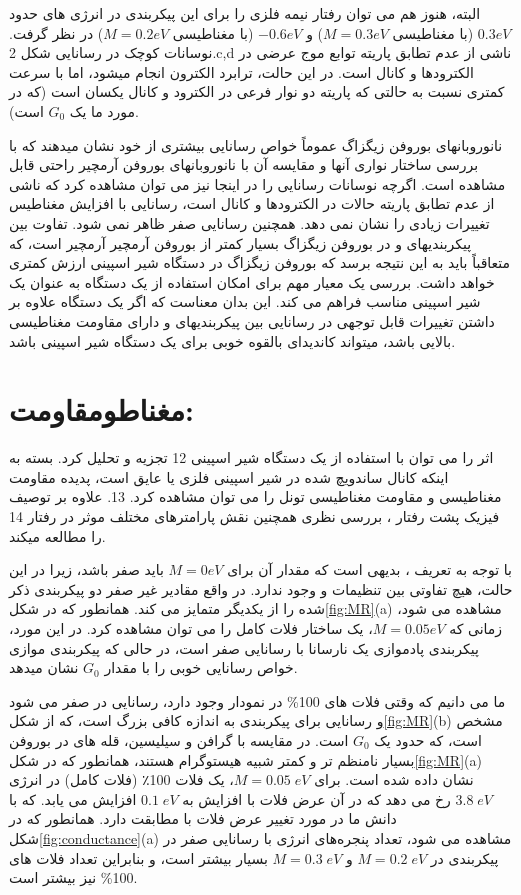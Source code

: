 البته، هنوز هم می توان رفتار نیمه فلزی را برای این پیکربندی در انرژی های حدود $0.3 eV$ (با مغناطیسی $M = 0.3 eV$) و $-0.6 eV$ (با مغناطیسی $M = 0.2 eV$) در نظر گرفت. نوسانات کوچک در رسانایی شکل 2.c,d ناشی از عدم تطابق پاریته توابع موج عرضی در الکترودها و کانال است. در این حالت، ترابرد الکترون انجام میشود، اما با سرعت کمتری نسبت به حالتی که پاریته دو نوار فرعی در الکترود و کانال یکسان است (که در مورد ما یک $G_0$ است).

نانوروبانهای بوروفن زیگزاگ عموماً خواص رسانایی بیشتری از خود نشان میدهند که با بررسی ساختار نواری آنها و مقایسه آن با نانوروبانهای بوروفن آرمچیر راحتی قابل مشاهده است. اگرچه نوسانات رسانایی را در اینجا نیز می توان مشاهده کرد که ناشی از عدم تطابق پاریته حالات در الکترودها و کانال است، رسانایی با افزایش مغناطیس تغییرات زیادی را نشان نمی دهد. همچنین رسانایی صفر ظاهر نمی شود. تفاوت بین پیکربندیهای  و  در بوروفن زیگزاگ بسیار کمتر از بوروفن آرمچیر آرمچیر است، که متعاقباً باید به این نتیجه برسد که بوروفن زیگزاگ در دستگاه شیر اسپینی ارزش کمتری خواهد داشت. بررسی  یک معیار مهم برای امکان استفاده از یک دستگاه به عنوان یک شیر اسپینی مناسب فراهم می کند. این بدان معناست که اگر یک دستگاه علاوه بر داشتن تغییرات قابل توجهی در رسانایی بین پیکربندیهای  و  دارای مقاومت مغناطیسی بالایی باشد، میتواند کاندیدای بالقوه خوبی برای یک دستگاه شیر اسپینی باشد.

\section{مغناطومقاومت:}
اثر  را می توان با استفاده از یک دستگاه شیر اسپینی 12 تجزیه و تحلیل کرد. بسته به اینکه کانال ساندویچ شده در شیر اسپینی فلزی یا عایق است، پدیده مقاومت مغناطیسی  و مقاومت مغناطیسی تونل  را می توان مشاهده کرد. 13. علاوه بر توصیف فیزیک پشت رفتار ، بررسی نظری  همچنین نقش پارامترهای مختلف موثر در رفتار  14 را مطالعه میکند.

با توجه به تعریف ، بدیهی است که مقدار آن برای $M = 0 eV$ باید صفر باشد، زیرا در این حالت، هیچ تفاوتی بین تنظیمات  و  وجود ندارد. در واقع مقادیر غیر صفر  دو پیکربندی ذکر شده را از یکدیگر متمایز می کند. همانطور که در شکل\ref{fig:MR}(a) مشاهده می شود، زمانی که $M = 0.05 eV$، یک ساختار فلات کامل را می توان مشاهده کرد. در این مورد، پیکربندی پادموازی یک نارسانا با رسانایی صفر است، در حالی که پیکربندی موازی خواص رسانایی خوبی را با مقدار $G_0$ نشان میدهد. 

ما می دانیم که وقتی فلات های 100\% در نمودار  وجود دارد، رسانایی در  صفر می شود و رسانایی برای پیکربندی  به اندازه کافی بزرگ است، که از شکل\ref{fig:MR}(b) مشخص است، که حدود یک $G_0$ است. در مقایسه با گرافن و سیلیسین، قله های  در بوروفن بسیار نامنظم تر و کمتر شبیه هیستوگرام هستند، همانطور که در شکل\ref{fig:MR}(a) نشان داده شده است. برای $M = 0.05\; eV$، یک فلات 100٪ (فلات کامل) در انرژی $3.8\; eV$ رخ می دهد که در آن عرض فلات با افزایش  به $0.1\; eV$ افزایش می یابد. که با دانش ما در مورد تغییر عرض فلات با  مطابقت دارد.
همانطور که در شکل\ref{fig:conductance}(a) مشاهده می شود، تعداد پنجره‌های انرژی با رسانایی صفر در پیکربندی  در $M = 0.2\; eV$ و $M = 0.3\; eV$ بسیار بیشتر است، و بنابراین تعداد فلات های 100\% نیز بیشتر است. 

